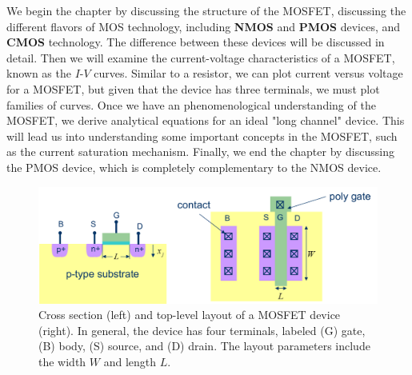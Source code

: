 We begin the chapter by discussing the structure of the MOSFET, discussing the different flavors of MOS technology, including \textbf{NMOS} and \textbf{PMOS} devices, and \textbf{CMOS} technology.  The difference between these devices will be discussed in detail.  Then we will examine the current-voltage characteristics of a MOSFET, known as the $I$-$V$ curves.  Similar to a resistor, we can plot current versus voltage for a MOSFET, but given that the device has three terminals, we must plot families of curves.  Once we have an phenomenological understanding of the MOSFET, we derive analytical equations for an ideal "long channel" device.  This will lead us into understanding some important concepts in the MOSFET, such as the current saturation mechanism.  Finally, we end the chapter by discussing the PMOS device, which is completely complementary to the NMOS device.
\newpage
\begin{figure}[t]
\centering
\includegraphics[width=.95\columnwidth]{mosfet_layout}
\caption{Cross section (left) and top-level layout of a MOSFET device (right).  In general, the device has four terminals, labeled (G) gate, (B) body, (S) source, and (D) drain.  The layout parameters include the width $W$ and length $L$.}
\label{fig:mosfet_layout}
\end{figure}
